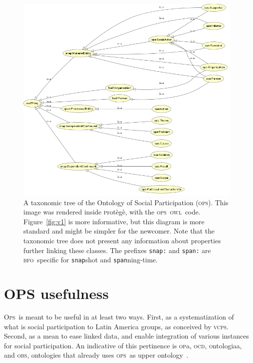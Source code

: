\documentclass[10pt,letterpaper]{article}
\newcommand{\ops}{\textsc{ops}}
\newcommand{\opsi}{O\textsc{ps}}
\newcommand{\vcps}{\textsc{vcps}}
\newcommand{\owl}{\textsc{owl}}
\newcommand{\bfo}{\textsc{bfo}}
\newcommand{\opa}{\textsc{op}a}
\newcommand{\ocd}{\textsc{ocd}}
\newcommand{\ontologiaa}{\textsc{o}ntologiaa}
\newcommand{\obs}{\textsc{obs}}
\newcommand{\protege}{\textsc{p}rot\`eg\`e}
\begin{document}
\begin{figure}
    \centering
    \includegraphics[width=\textwidth]{figs/opsTax}
    \caption{A taxonomic tree of the Ontology of Social Participation (\ops).
    This image was rendered inside \protege, with the \ops\ \owl\ code.
    Figure~\ref{fig:v1} is more informative, but this diagram is more standard and might be simpler for the newcomer.
    Note that the taxonomic tree does not present any information about properties further linking these classes.
    The prefixes {\tt snap:} and {\tt span:} are \bfo\ specific for {\tt snap}shot and {\tt span}ning-time.}
    \label{fig:owlCC}
\end{figure}


\section{OPS usefulness}\label{ospUtil}
\opsi\ is meant to be useful in at least two ways.
First, as a systematization of what is social participation to Latin America groups,
as conceived by \vcps.
Second, as a mean to ease linked data,
and enable integration of various instances for social participation.
An indicative of this pertinence is \opa, \ocd, \ontologiaa, and \obs,
ontologies that already uses \ops\ as upper ontology~\cite{pnud5}.
\end{document}
